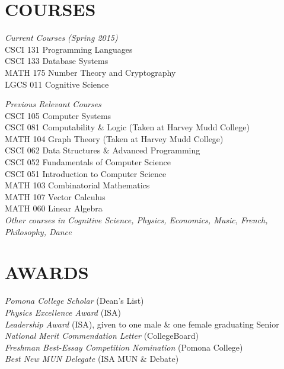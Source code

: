 \documentclass[margin, 10pt]{res} %
\begin{document}
\begin{resume}
\vspace{-0.3em}
\section{COURSES}

{\sl Current Courses (Spring 2015)} \\
CSCI 131 Programming Languages \\
CSCI 133 Database Systems \\
MATH 175 Number Theory and Cryptography \\
LGCS 011 Cognitive Science

{\sl Previous Relevant Courses} \\
CSCI 105 Computer Systems\\
CSCI 081 Computability \& Logic (Taken at Harvey Mudd College)\\
MATH 104 Graph Theory (Taken at Harvey Mudd College)\\
CSCI 062 Data Structures \& Advanced Programming \\
CSCI 052 Fundamentals of Computer Science \\
CSCI 051 Introduction to Computer Science \\
MATH 103 Combinatorial Mathematics \\
MATH 107 Vector Calculus \\
MATH 060 Linear Algebra  \\
\textit{Other courses in Cognitive Science, Physics, Economics, Music, French, Philosophy, Dance}



\section{AWARDS}

{\sl Pomona College Scholar} (Dean's List) \\
{\sl Physics Excellence Award} (ISA)\\
{ \sl Leadership Award }(ISA), given to one male \& one female graduating Senior\\ 
{\sl National Merit Commendation Letter}  (CollegeBoard) \\
{\sl Freshman Best-Essay Competition Nomination} (Pomona College) \\
{\sl Best New MUN Delegate} (ISA MUN \& Debate)



\end{resume}
\end{document}
